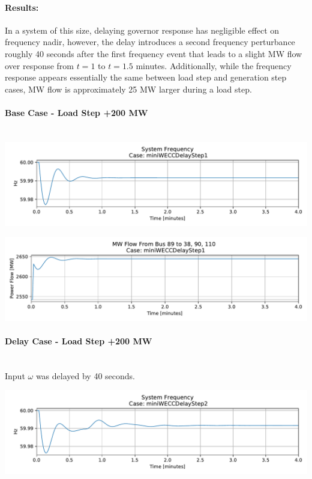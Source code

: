 \documentclass[12pt]{article}
\begin{document}
\paragraph{Results:} 
In a system of this size,
delaying governor response has negligible effect on frequency nadir, however, the delay introduces a second frequency perturbance roughly 40 seconds after the first frequency event that leads to a slight MW flow over response from $t=1$ to $t= 1.5$ minutes.
Additionally, while the frequency response appears essentially the same between load step and generation step cases, MW flow is approximately 25 MW larger during a load step.

\pagebreak
\paragraph{Base Case - Load Step +200 MW} \ \\

\includegraphics[width=\linewidth]{figures/miniWECCDelayStep1Freq}

\includegraphics[width=\linewidth]{figures/miniWECCDelayStep1MWflow89to38-90-110}

\paragraph{Delay Case - Load Step +200 MW} \ \\
Input $\omega$ was delayed by 40 seconds.

\includegraphics[width=\linewidth]{figures/miniWECCDelayStep2Freq}
\end{document}
